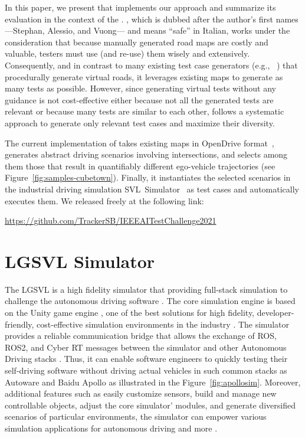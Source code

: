 \documentclass[conference]{IEEEtran}
\begin{document}
In this paper, we present \tool that implements our approach and summarize its evaluation in the context of the \challenge.
\tool, which is dubbed after the author's first names ---Stephan, Alessio, and Vuong--- and means ``safe'' in Italian, works under the consideration that because manually generated road maps are costly and valuable, testers must use (and re-use) them wisely and extensively. 
Consequently, and in contrast to many existing test case generators (e.g., ~\cite{DBLP:conf/icse/GambiMF19,DBLP:conf/icse/HuynhGF19,DBLP:conf/sigsoft/RiccioT20,DBLP:conf/issta/ZohdinasabRGT21,DBLP:conf/sbst/PanichellaGZR21}) that procedurally generate virtual roads, it leverages existing maps to generate as many tests as possible.
%
However, since generating virtual tests without any guidance is not cost-effective either because not all the generated tests are relevant or because many tests are similar to each other, \tool follows a systematic approach to generate only relevant test cases and maximize their diversity.

The current implementation of \tool takes existing maps in OpenDrive format~\cite{dupuis2010opendrive}, generates abstract driving scenarios involving intersections, and selects among them those that result in quantifiably different ego-vehicle trajectories (see Figure~\ref{fig:samples-cubetown}). Finally, it instantiates the selected scenarios in the industrial driving simulation SVL~Simulator~\cite{rong2020lgsvl} as test cases and automatically executes them.
%
We released \tool freely at the following link:
\begin{center}
\href{https://github.com/TrackerSB/IEEEAITestChallenge2021}{https://github.com/TrackerSB/IEEEAITestChallenge2021}
\end{center}


\section{LGSVL Simulator}
\label{subsect:lgsvl}
The LGSVL is a high fidelity simulator that providing full-stack simulation to challenge the autonomous driving software \cite{rong2020lgsvl}. The core simulation engine is based on the Unity game engine \cite{rong2020lgsvl}, one of the best solutions for high fidelity, developer-friendly, cost-effective simulation environments in the industry \cite{craighead2008using}. The simulator provides a reliable communication bridge that allows the exchange of ROS, ROS2, and Cyber RT messages between the simulator and other Autonomous Driving stacks \cite{rong2020lgsvl}. Thus, it can enable software engineers to quickly testing their self-driving software without driving actual vehicles in such common stacks as Autoware and Baidu Apollo \cite{rong2020lgsvl} as illustrated in the Figure~\ref{fig:apollosim}. Moreover, additional features such as easily customize sensors, build and manage new controllable objects, adjust the core simulator' modules, and generate diversified scenarios of particular environments, the simulator can empower various simulation applications for autonomous driving and more \cite{rong2020lgsvl}.
\end{document}

